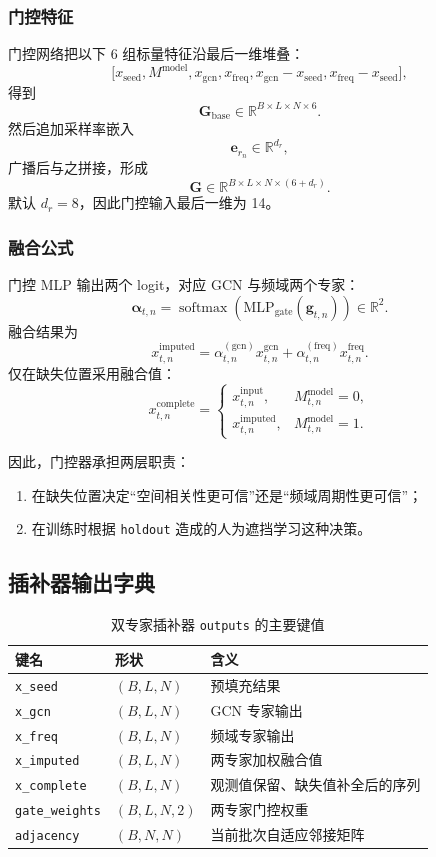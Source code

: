 \documentclass[UTF8,11pt,a4paper]{ctexart}
\DeclareMathOperator{\softmax}{softmax}
\begin{document}
\subsubsection{门控特征}

门控网络把以下 6 组标量特征沿最后一维堆叠：
\[
\big[
x_{\mathrm{seed}},
M^{\mathrm{model}},
x_{\mathrm{gcn}},
x_{\mathrm{freq}},
x_{\mathrm{gcn}}-x_{\mathrm{seed}},
x_{\mathrm{freq}}-x_{\mathrm{seed}}
\big],
\]
得到
\[
\bm{G}_{\mathrm{base}}\in\mathbb{R}^{B\times L\times N\times 6}.
\]
然后追加采样率嵌入
\[
\bm{e}_{r_n}\in\mathbb{R}^{d_r},
\]
广播后与之拼接，形成
\[
\bm{G}\in\mathbb{R}^{B\times L\times N\times (6+d_r)}.
\]
默认 $d_r=8$，因此门控输入最后一维为 14。

\subsubsection{融合公式}

门控 MLP 输出两个 logit，对应 GCN 与频域两个专家：
\[
\bm{\alpha}_{t,n}
=
\softmax(\mathrm{MLP}_{\mathrm{gate}}(\bm{g}_{t,n}))
\in\mathbb{R}^{2}.
\]
融合结果为
\[
x^{\mathrm{imputed}}_{t,n}
=
\alpha^{(\mathrm{gcn})}_{t,n}x^{\mathrm{gcn}}_{t,n}
+
\alpha^{(\mathrm{freq})}_{t,n}x^{\mathrm{freq}}_{t,n}.
\]
仅在缺失位置采用融合值：
\[
x^{\mathrm{complete}}_{t,n}
=
\begin{cases}
x^{\mathrm{input}}_{t,n}, & M^{\mathrm{model}}_{t,n}=0,\\
x^{\mathrm{imputed}}_{t,n}, & M^{\mathrm{model}}_{t,n}=1.
\end{cases}
\]

因此，门控器承担两层职责：
\begin{enumerate}
  \item 在缺失位置决定“空间相关性更可信”还是“频域周期性更可信”；
  \item 在训练时根据 \texttt{holdout} 造成的人为遮挡学习这种决策。
\end{enumerate}

\subsection{插补器输出字典}

\begin{table}[H]
\centering
\caption{双专家插补器 \texttt{outputs} 的主要键值}
\begin{tabular}{@{}lll@{}}
\toprule
键名 & 形状 & 含义 \\
\midrule
\texttt{x\_seed} & $(B,L,N)$ & 预填充结果 \\
\texttt{x\_gcn} & $(B,L,N)$ & GCN 专家输出 \\
\texttt{x\_freq} & $(B,L,N)$ & 频域专家输出 \\
\texttt{x\_imputed} & $(B,L,N)$ & 两专家加权融合值 \\
\texttt{x\_complete} & $(B,L,N)$ & 观测值保留、缺失值补全后的序列 \\
\texttt{gate\_weights} & $(B,L,N,2)$ & 两专家门控权重 \\
\texttt{adjacency} & $(B,N,N)$ & 当前批次自适应邻接矩阵 \\
\bottomrule
\end{tabular}
\end{table}
\end{document}
